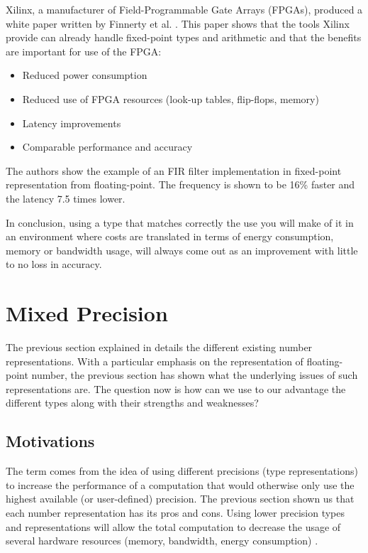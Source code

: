 Xilinx, a manufacturer of Field-Programmable Gate Arrays (FPGAs), produced a white paper written by Finnerty et al. \cite{Xilinx2017}. This paper shows that the tools Xilinx provide can already handle fixed-point types and arithmetic and that the benefits are important for use of the FPGA:
\begin{itemize}
  \item Reduced power consumption
  \item Reduced use of FPGA resources (look-up tables, flip-flops, memory)
  \item Latency improvements
  \item Comparable performance and accuracy
\end{itemize}
The authors show the example of an FIR filter implementation in fixed-point representation from floating-point. The frequency is shown to be 16\% faster and the latency 7.5 times lower.

In conclusion, using a type that matches correctly the use you will make of it in an environment where costs are translated in terms of energy consumption, memory or bandwidth usage, will always come out as an improvement with little to no loss in accuracy.


\section{Mixed Precision}

The previous section explained in details the different existing number representations. With a particular emphasis on the representation of floating-point number, the previous section has shown what the underlying issues of such representations are. The question now is how can we use to our advantage the different types along with their strengths and weaknesses?

\subsection{Motivations}

The term  comes from the idea of using different precisions (type representations) to increase the performance of a computation that would otherwise only use the highest available (or user-defined) precision. The previous section shown us that each number representation has its pros and cons. Using lower precision types and representations will allow the total computation to decrease the usage of several hardware resources (memory, bandwidth, energy consumption) \cite{Horowitz2014,Nips2015}.

